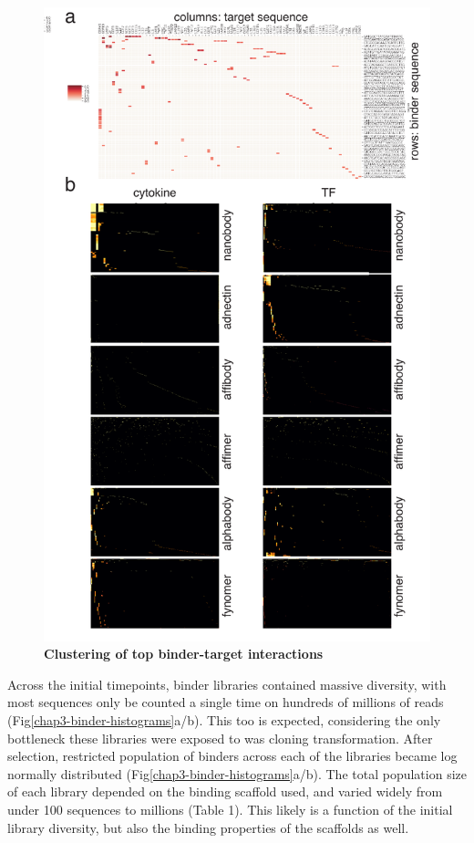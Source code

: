\begin{figure}
\includegraphics[width=\textwidth]{figures/chapter3/20190621_fig7_selection_clustermaps.pdf}
\caption[Clustering of top binder-target interactions]{\textbf{Clustering of top binder-target interactions}
\label{chap3-selection-clusters}}
\end{figure}

 Across the initial timepoints, binder libraries contained massive diversity, with most sequences only be counted a single time on hundreds of millions of reads (Fig\ref{chap3-binder-histograms}a/b). This too is expected, considering the only bottleneck these libraries were exposed to was cloning transformation. After selection, restricted population of binders across each of the libraries became log normally distributed (Fig\ref{chap3-binder-histograms}a/b). The total population size of each library depended on the binding scaffold used, and varied widely from under 100 sequences to millions (Table 1). This likely is a function of the initial library diversity, but also the binding properties of the scaffolds as well. 

